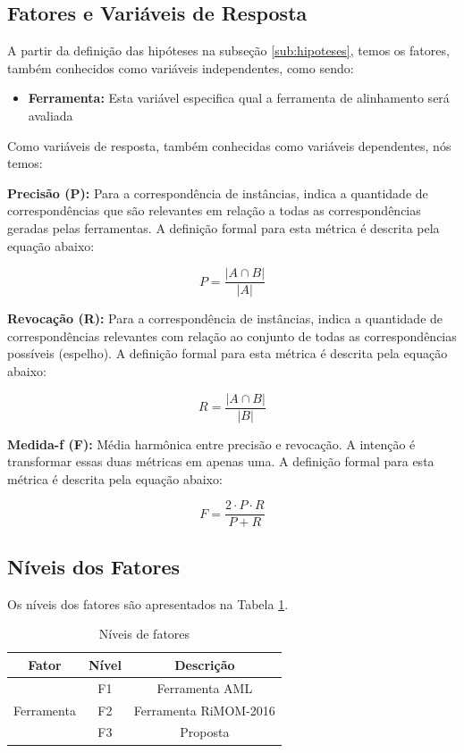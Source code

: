 \subsection{Fatores e Variáveis de Resposta}
A partir da definição das hipóteses na subseção \ref{sub:hipoteses}, temos os fatores, também conhecidos como variáveis independentes, como sendo:
\begin{itemize}
	\item \textbf{Ferramenta:} Esta variável especifica qual a ferramenta de alinhamento será avaliada
\end{itemize}

Como variáveis de resposta, também conhecidas como variáveis dependentes, nós temos:

\textbf{Precisão (P):} Para a correspondência de instâncias, indica a quantidade de correspondências que são relevantes em relação a todas as correspondências geradas pelas ferramentas. A definição formal para esta métrica é descrita pela equação abaixo:

\begin{equation}
P = \dfrac{|{A}\cap{B}|}{|A|}
\end{equation}

\textbf{Revocação (R):} Para a correspondência de instâncias, indica a quantidade de correspondências relevantes com relação ao conjunto de todas as correspondências possíveis (espelho). A definição formal para esta métrica é descrita pela equação abaixo:

\begin{equation}
R = \dfrac{|{A}\cap{B}|}{|B|}
\end{equation}

\textbf{Medida-f (F):} Média harmônica entre precisão e revocação. A intenção é transformar essas duas métricas em apenas uma. A definição formal para esta métrica é descrita pela equação abaixo:

\begin{equation}
F = \dfrac{{2}\cdot{P}\cdot{R}}{P+R}
\end{equation}

\subsection{Níveis dos Fatores}
\label{sub:fator_nivel}
Os níveis dos fatores são apresentados na Tabela \ref{tab:factor_levels}.

\begin{table}[h]
	\centering
	\caption{Níveis de fatores}
	\label{tab:factor_levels}
	\begin{tabular}{|c|c|c|}
		\hline
		\textbf{Fator}        & \textbf{Nível} &  \textbf{Descrição}   \\ \hline
		\multirow{3}{*}{Ferramenta} &       F1       &    Ferramenta AML     \\ \cline{2-3}
		&       F2       & Ferramenta RiMOM-2016 \\ \cline{2-3}
		&       F3       &       Proposta       \\ \hline
	\end{tabular}
\end{table}

